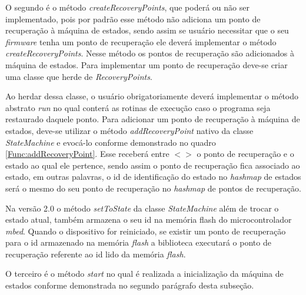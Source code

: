 O segundo é o método \textit{createRecoveryPoints}, que poderá ou não ser implementado, pois por padrão esse método não adiciona um ponto de recuperação à máquina de estados, sendo assim se usuário necessitar que o seu \textit{firmware} tenha um ponto de recuperação ele deverá implementar o método \textit{createRecoveryPoints}. Nesse método os pontos de recuperação são adicionados à máquina de estados. Para implementar um ponto de recuperação deve-se criar uma classe que herde de \textit{RecoveryPoints}. 

Ao herdar dessa classe, o usuário obrigatoriamente deverá implementar o método abstrato \textit{run} no qual conterá as rotinas de execução caso o programa seja restaurado daquele ponto. Para adicionar um ponto de recuperação à máquina de estados, deve-se utilizar o método \textit{addRecoveryPoint} nativo da classe \textit{StateMachine} e evocá-lo conforme demonstrado no quadro \autoref{Func:addRecoveryPoint}. Esse receberá entre $< >$ o ponto de recuperação e o estado ao qual ele pertence, sendo assim o ponto de recuperação fica associado ao estado, em outras palavras, o id de identificação do estado no \textit{hashmap} de estados será o mesmo do seu ponto de recuperação no \textit{hashmap} de pontos de recuperação.

Na versão 2.0 o método \textit{setToState} da classe \textit{StateMachine} além de trocar o estado atual, também armazena o seu id na memória flash do microcontrolador \textit{mbed}. Quando o dispositivo for reiniciado, se existir um ponto de recuperação para o id armazenado na memória \textit{flash} a biblioteca executará o ponto de recuperação referente ao id lido da memória \textit{flash}.

O terceiro é o método \textit{start} no qual é realizada a inicialização da máquina de estados conforme demonstrada no segundo parágrafo desta subseção.

